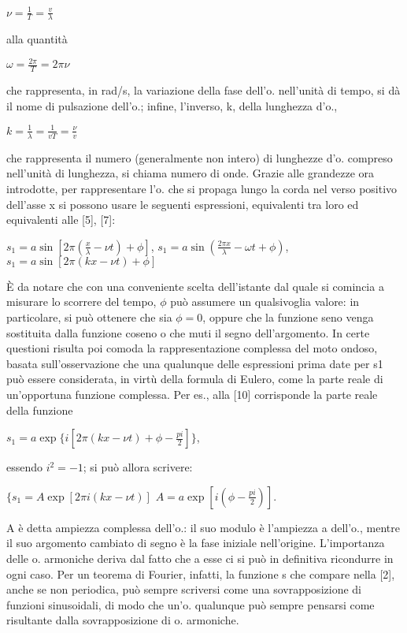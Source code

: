 \documentclass[a4paper]{article}
\begin{document}
$\nu=\frac{1}{T}=\frac{v}{\lambda}$

alla quantità

$\omega=\frac{2\pi}{T}=2\pi\nu$

che rappresenta, in rad/s, la variazione della fase dell’o. nell’unità di tempo, si dà il nome di pulsazione dell’o.; infine, l’inverso, k, della lunghezza d’o., 

$k=\frac{1}{\lambda}=\frac{1}{vT}=\frac{\nu}{v}$

che rappresenta il numero (generalmente non intero) di lunghezze d’o. compreso nell’unità di lunghezza, si chiama numero di onde. Grazie alle grandezze ora introdotte, per rappresentare l’o. che si propaga lungo la corda nel verso positivo dell’asse x si possono usare le seguenti espressioni, equivalenti tra loro ed equivalenti alle [5], [7]: 

$s_1=a\sin[2\pi(\frac{x}{\lambda}-\nu t)+\phi]$,
$s_1=a\sin(\frac{2\pi x}{\lambda}-\omega t+\phi)$,
$s_1=a\sin[2\pi(kx-\nu t)+\phi]$

È da notare che con una conveniente scelta dell’istante dal quale si comincia a misurare lo scorrere del tempo, $\phi$ può assumere un qualsivoglia valore: in particolare, si può ottenere che sia $\phi=0$, oppure che la funzione seno venga sostituita dalla funzione coseno o che muti il segno dell’argomento. In certe questioni risulta poi comoda la rappresentazione complessa del moto ondoso, basata sull’osservazione che una qualunque delle espressioni prima date per s1 può essere considerata, in virtù della formula di Eulero, come la parte reale di un’opportuna funzione complessa. Per es., alla [10] corrisponde la parte reale della funzione 

$s_1=a\exp\{i[2\pi(kx-\nu t)+\phi-\frac{pi}{2}]\}$,

essendo $i^2=-1$; si può allora scrivere:

$\{s_1=A\exp[2\pi i(kx-\nu t)]$
$A=a\exp[i(\phi-\frac{pi}{2})]$.

A è detta ampiezza complessa dell’o.: il suo modulo è l’ampiezza a dell’o., mentre il suo argomento cambiato di segno è la fase iniziale nell’origine. L’importanza delle o. armoniche deriva dal fatto che a esse ci si può in definitiva ricondurre in ogni caso. Per un teorema di Fourier, infatti, la funzione s che compare nella [2], anche se non periodica, può sempre scriversi come una sovrapposizione di funzioni sinusoidali, di modo che un’o. qualunque può sempre pensarsi come risultante dalla sovrapposizione di o. armoniche. 
\end{document}

